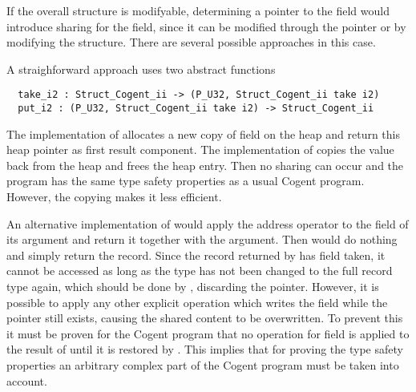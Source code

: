 If the overall structure is modifyable, determining a pointer to the field would introduce sharing for the
field, since it can be modified through the pointer or by modifying the structure. There are several possible
approaches in this case.

A straighforward approach uses two abstract functions
\begin{verbatim}
  take_i2 : Struct_Cogent_ii -> (P_U32, Struct_Cogent_ii take i2)
  put_i2 : (P_U32, Struct_Cogent_ii take i2) -> Struct_Cogent_ii
\end{verbatim}
The implementation of  allocates a new copy of field  on the heap
and return this heap pointer as first result component. The implementation of  copies the 
value back from the heap and frees the heap entry. Then no sharing can occur and the program has the 
same type safety properties as a usual Cogent program. However, the copying makes it less efficient.

An alternative implementation of  would apply the address operator to the field  of 
its argument and return it together with the argument. Then  would do nothing and simply 
return the record. Since the record returned by  has field  taken, it
cannot be accessed as long as the type has not been changed to the full record type again, which should be 
done by , discarding the pointer. However, it is possible to apply any other explicit 
operation which writes the field  while the pointer still exists, causing the shared content to
be overwritten. To prevent this it must be proven for the Cogent program that no  operation for field 
 is applied to the result of  until it is restored by . This implies that
for proving the type safety properties an arbitrary complex part of the Cogent program must be taken into
account.

